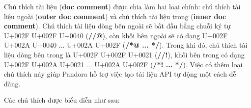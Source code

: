     Chú thích tài liệu (\textbf{doc comment}) được chia làm hai loại chính: chú thích tài liệu ngoài (\textbf{outer doc comment}) và chú thích tài liệu trong (\textbf{inner doc comment}). Chú thích tài liệu dòng bên ngoài sẽ bắt đầu bằng chuỗi ký tự U+002F U+002F U+0040 (\textbf{//@}), còn khối bên ngoài sẽ có dạng U+002F U+002A U+0040 ... U+002A U+002F (\textbf{/*@ ... */}). Trong khi đó, chú thích tài liệu dòng bên trong là U+002F U+002F U+0021 (\textbf{//!}), khối bên trong có dạng U+002F U+002A U+0021 ... U+002A U+002F (\textbf{/*! ... */}). Việc có thêm loại chú thích này giúp Pandora hỗ trợ việc tạo tài liệu API tự động một cách dễ dàng.

    Các chú thích được biểu diễn như sau:

    \regexlinecomment

    \regexblockcomment

    \regexdoc

